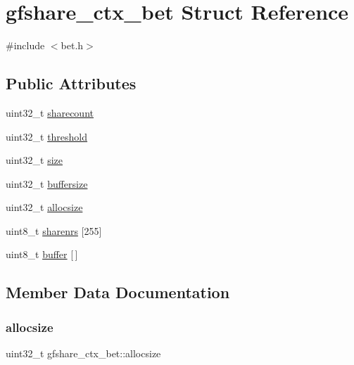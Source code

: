 \hypertarget{structgfshare__ctx__bet}{}\section{gfshare\+\_\+ctx\+\_\+bet Struct Reference}
\label{structgfshare__ctx__bet}


{\ttfamily \#include $<$bet.\+h$>$}

\subsection*{Public Attributes}
\begin{DoxyCompactItemize}
\item 
uint32\+\_\+t \hyperlink{structgfshare__ctx__bet_a4c765415b8d842a92c6644b59e036a3f}{sharecount}
\item 
uint32\+\_\+t \hyperlink{structgfshare__ctx__bet_ae63c84f60d45927b32f01ee03bc75bb8}{threshold}
\item 
uint32\+\_\+t \hyperlink{structgfshare__ctx__bet_aadffa692ab06b96d49f1e38024707a03}{size}
\item 
uint32\+\_\+t \hyperlink{structgfshare__ctx__bet_a6d3cec2d48e3a5530f2fb955085487d0}{buffersize}
\item 
uint32\+\_\+t \hyperlink{structgfshare__ctx__bet_a8ae395c7d798dfc19764f0ccdbe8e405}{allocsize}
\item 
uint8\+\_\+t \hyperlink{structgfshare__ctx__bet_a93046b5752b076392fbc010cf97bec2c}{sharenrs} \mbox{[}255\mbox{]}
\item 
uint8\+\_\+t \hyperlink{structgfshare__ctx__bet_a14d97810d00ad0a397b006c3b32eb4b5}{buffer} \mbox{[}$\,$\mbox{]}
\end{DoxyCompactItemize}


\subsection{Member Data Documentation}
\mbox{\label{structgfshare__ctx__bet_a8ae395c7d798dfc19764f0ccdbe8e405}} 
\subsubsection{\texorpdfstring{allocsize}{allocsize}}
{\footnotesize\ttfamily uint32\+\_\+t gfshare\+\_\+ctx\+\_\+bet\+::allocsize}


